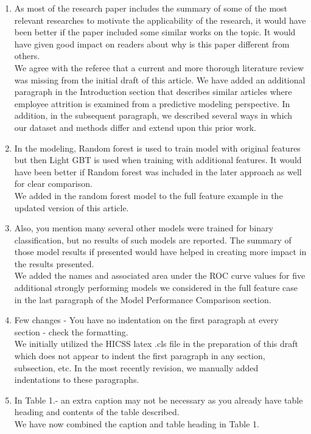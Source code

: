 \documentclass{amsart}[12pt]
\begin{document}
\begin{enumerate}
    \item   {\color{blue}
        As most of the research paper includes the summary of some of the most relevant researches to motivate the applicability of the research, it would have been better if the paper included some similar works on the topic.
        It would have given good impact on readers about why is this paper different from others. 
        }\\

We agree with the referee that a current and more thorough literature review was missing from the 
initial draft of this article.  We have added an additional paragraph in the Introduction section 
that describes similar articles where employee attrition is examined from a predictive modeling 
perspective.  In addition, in the subsequent paragraph, we described several ways in which 
our dataset and methods differ and extend upon this prior work. 

    \item   {\color{blue}
        In the modeling, Random forest is used to train model with original features but then Light GBT is used when training with additional features. It would have been better if Random forest was included in the later approach as well for clear comparison. 
        }\\

        We added in the random forest model to the full feature example in the updated version of this article.

    \item   {\color{blue}
   Also, you mention many several other models were trained for binary classification, but no results of such models are reported. The summary of those model results if presented would have helped in creating more impact in the results presented. 
        }\\

        We added the names and associated area under the ROC curve values for five additional strongly performing 
        models we considered in the full feature case in the last paragraph of the Model Performance 
        Comparison section. 
    \item   {\color{blue}
        Few changes - You have no indentation on the first paragraph at every section - check the formatting. 
        }\\

        We initially utilized the HICSS latex .cls file in the preparation of this draft which does not appear 
        to indent the first paragraph in any section, subsection, etc. In the most recently revision, 
        we manually added indentations to these paragraphs.

    \item   {\color{blue}
        In Table 1.- an extra caption may not be necessary as you already have table heading and contents of the table described. 
        }\\

        We have now combined the caption and table heading in Table 1.

\end{enumerate}
\end{document}
